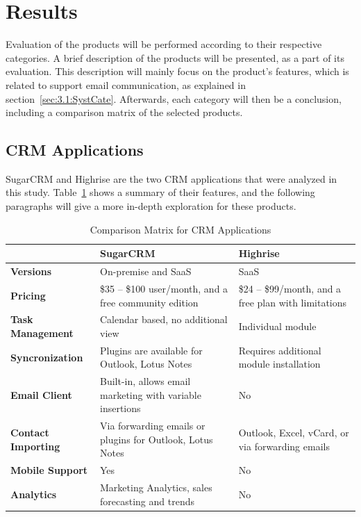 \section{Results}
\label{sec:3.3:Resul}
Evaluation of the products will be performed according to their respective categories. A brief description of the products will be presented, as a part of its evaluation. This description will mainly focus on the product's features, which is related to support email communication, as explained in section~\ref{sec:3.1:SystCate}. Afterwards, each category will then be a conclusion, including a comparison matrix of the selected products.

\subsection{CRM Applications}
\label{subsec:3.3.1:CRMAppl}

SugarCRM and Highrise are the two \ac{CRM} applications that were analyzed in this study. Table~\ref{tab:comp_matr_crm} shows a summary of their features, and the following paragraphs will give a more in-depth exploration for these products.

\clearpage

\begin{table}[H]
\begin{center}
	\caption[Comparison Matrix for CRM Applications]{Comparison Matrix for CRM Applications} \label{tab:comp_matr_crm}
    \begin{tabular}{ | p{3cm} | p{5cm} | p{5cm} | }
	\hline
	& \textbf{SugarCRM} & \textbf{Highrise} \\ \hline
	\textbf{Versions} & On-premise and SaaS & SaaS \\ \hline
	\textbf{Pricing} & \$35 -- \$100 user/month, and a free community edition & \$24 -- \$99/month, and a free plan with limitations \\ \hline
	\textbf{Task Management} & Calendar based, no additional view & Individual module \\ \hline
	\textbf{Syncronization} & Plugins are available for Outlook, Lotus Notes & Requires additional module installation \\ \hline
	\textbf{Email Client} & Built-in, allows email marketing with variable insertions & No \\ \hline
	\textbf{Contact Importing} & Via forwarding emails or plugins for Outlook, Lotus Notes & Outlook, Excel, vCard, or via forwarding emails \\ \hline
	\textbf{Mobile Support} & Yes & No \\ \hline
	\textbf{Analytics} & Marketing Analytics, sales forecasting and trends & No \\ \hline
    \end{tabular}
\end{center}
\end{table}


